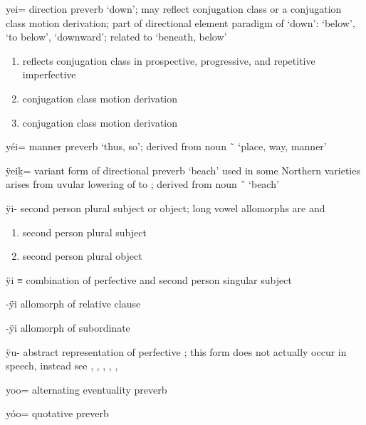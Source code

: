 \begin{morphdesc}[resume*=alphalist]
\item[yei=]
	direction preverb ‘down’;
	may reflect  conjugation class or a  conjugation class motion derivation;
	part of directional element paradigm of  ‘down’:
		 ‘below’,  ‘to below’,  ‘downward’;
	related to  ‘beneath, below’
	\begin{enumerate}
	\item	reflects  conjugation class in prospective, progressive, and repetitive imperfective
	\item	{} conjugation class motion derivation
	\item	{} conjugation class motion derivation
	\end{enumerate}

\item[yéi=]
	manner preverb ‘thus, so’;
	derived from noun  \~\  ‘place, way, manner’

\item[ÿeiḵ=]
	variant form of directional preverb  ‘beach’ used in some Northern varieties
	arises from uvular lowering of  to ;
	derived from noun  \~\  ‘beach’

\item[ÿi-]\label{m:ÿi-}
	second person plural subject or object; long vowel allomorphs are  and 
	\begin{enumerate}
	\item	second person plural subject
	\item	second person plural object
	\end{enumerate}

\item[ÿi]
	≡ 
	combination of perfective  and
		second person singular subject 

\item[-ÿi]\label{m:-ÿi-rel}
	allomorph of relative clause 

\item[-ÿi]\label{m:-ÿi-sub}
	allomorph of subordinate 

\item[ÿu-]\label{m:ÿu-}
	abstract representation of perfective ;
	this form does not actually occur in speech, instead see
		, , ,  , , 

\item[yoo=]
	alternating eventuality preverb

\item[yóo=]
	quotative preverb

\end{morphdesc}

